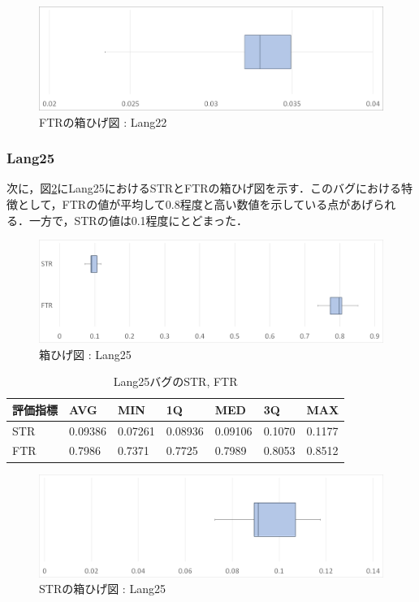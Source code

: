 \documentclass[uplatex,dvipdfmx,a4paper]{jsarticle}
\begin{document}
\begin{figure}[t]
  \centering
  \includegraphics[width=\linewidth]{fig/Lang22_boxplot_FTR.png}
  \caption{FTRの箱ひげ図 : Lang22}
  \label{fig:Lang22_boxplot_FTR}
\end{figure}
\subsubsection{Lang25}
次に，図\ref{fig:Lang25_boxplot}にLang25におけるSTRとFTRの箱ひげ図を示す．このバグにおける特徴として，FTRの値が平均して0.8程度と高い数値を示している点があげられる．一方で，STRの値は0.1程度にとどまった．
\begin{figure}[t]
  \centering
  \includegraphics[width=\linewidth]{fig/Lang25_boxplot.png}
  \caption{箱ひげ図 : Lang25}
  \label{fig:Lang25_boxplot}
\end{figure}
\begin{table}[b]
  \centering
  \caption{Lang25バグのSTR, FTR}
  \label{tab:Lang25}
  \begin{tabular}{l|llllll} \hline\hline
    評価指標 & AVG         & MIN & 1Q & MED & 3Q & MAX   \\\hline
    STR & 0.09386 & 0.07261 & 0.08936 & 0.09106 & 0.1070 & 0.1177  \\
    FTR & 0.7986 & 0.7371 & 0.7725 & 0.7989 & 0.8053 & 0.8512 \\\hline\hline
  \end{tabular}
\end{table}
\begin{figure}[t]
  \centering
  \includegraphics[width=\linewidth]{fig/Lang25_boxplot_STR.png}
  \caption{STRの箱ひげ図 : Lang25}
  \label{fig:Lang25_boxplot_STR}
\end{figure}
\end{document}

